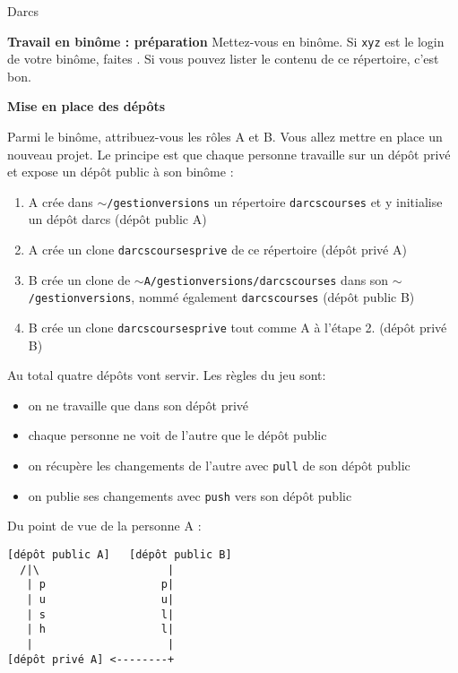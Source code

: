 \documentclass[10pt]{article}\usepackage[nu]{esial}
\begin{document}
\begin{part}{Darcs}
\begin{Exercice}{\bf Travail en binôme : préparation}
Mettez-vous en binôme.
Si {\tt xyz} est le login de votre binôme, faites .
Si vous pouvez lister le contenu de ce répertoire, c'est bon.
\end{Exercice}

\begin{Exercice} {\bf Mise en place des dépôts}

Parmi le binôme, attribuez-vous les rôles A et B.
Vous allez mettre en place un nouveau projet. Le principe est que chaque personne
travaille sur un dépôt privé et expose un dépôt public à son binôme :

\begin{enumerate}
\item A crée dans {\tt $\sim$/gestionversions} un répertoire {\tt darcscourses}
      et y initialise un dépôt darcs (dépôt public A)
\item A crée un clone {\tt darcscoursesprive} de ce répertoire (dépôt privé A)
\item B crée un clone de {\tt $\sim$A/gestionversions/darcscourses} dans son {\tt $\sim$/gestionversions},
      nommé également {\tt darcscourses} (dépôt public B)
\item B crée un clone {\tt darcscoursesprive} tout comme A à l'étape 2.
      (dépôt privé B)
\end{enumerate}


\noindent\begin{minipage}[b]{.6\textwidth}

Au total quatre dépôts vont servir. Les règles du jeu sont:

\begin{itemize}
\item on ne travaille que dans son dépôt privé
\item chaque personne ne voit de l'autre que le dépôt public
\item on récupère les changements de l'autre avec {\tt pull} de son dépôt public
\item on publie ses changements avec {\tt push} vers son dépôt public
\end{itemize}

\bigskip

\end{minipage}\hfill\begin{minipage}[b]{.38\textwidth}
Du point de vue de la personne A :
\begin{small}
\begin{verbatim}
[dépôt public A]   [dépôt public B]
  /|\                    |
   | p                  p|
   | u                  u|
   | s                  l|
   | h                  l|
   |                     |
[dépôt privé A] <--------+
\end{verbatim}
\end{small}
\end{minipage}


\end{Exercice}
\end{part}
\end{document}
